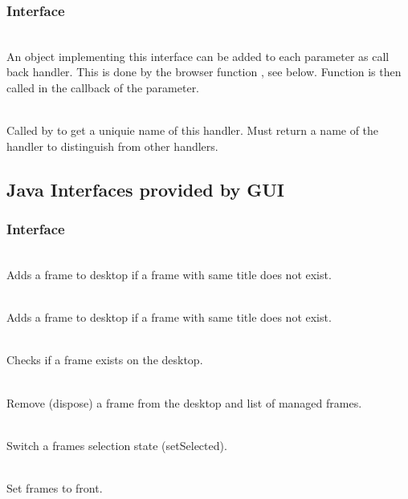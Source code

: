\subsubsection{Interface }
\bcir
\item {}\\
An object implementing this interface can be added to each parameter
as call back handler. This is done by the browser function ,
see below. Function  is then called in the callback
of the parameter.
\item {}\\
Called by  to get a uniquie name of this handler.
Must return a name of the handler to distinguish from other handlers.
\ecir
\subsection{Java Interfaces provided by GUI}
\subsubsection{Interface }
\bcir
\item {}\\
Adds a frame to desktop if a frame with same title does not exist.
\item {}\\
Adds a frame to desktop if a frame with same title does not exist.
\item {}\\
Checks if a frame exists on the desktop.
\item {}\\
Remove (dispose) a frame from the desktop and list of managed frames.
\item {}\\
Switch a frames selection state (setSelected).
\item {}\\
Set frames to front.
\ecir
